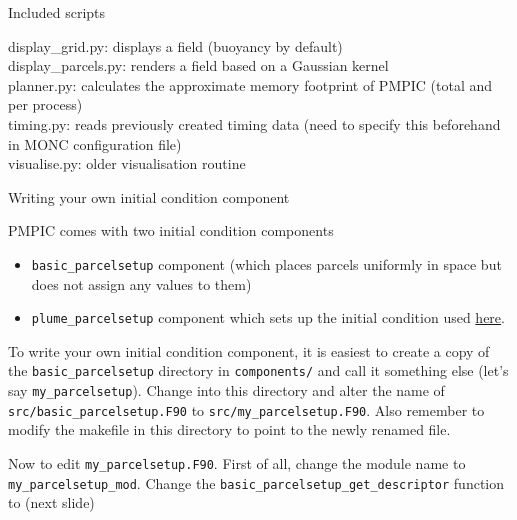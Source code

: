 \documentclass{beamer}
\begin{document}
\begin{frame}{Included scripts}
\protect\hypertarget{included-scripts}{}

display\_grid.py: displays a field (buoyancy by default)\\
display\_parcels.py: renders a field based on a Gaussian kernel\\
planner.py: calculates the approximate memory footprint of PMPIC (total
and per process)\\
timing.py: reads previously created timing data (need to specify this
beforehand in MONC configuration file)\\
visualise.py: older visualisation routine
\end{frame}


\begin{frame}[fragile]{Writing your own initial condition component}
\protect\hypertarget{writing-your-own-initial-condition-component}{}

PMPIC comes with two initial condition components
\begin{itemize}
\item \texttt{basic\_parcelsetup} component (which places parcels uniformly in
space but does not assign any values to them)
\item \texttt{plume\_parcelsetup} component which sets up the initial
condition used
\href{https://rmets.onlinelibrary.wiley.com/doi/10.1002/qj.3319}{here}.
\end{itemize}

To write your own initial condition component, it is easiest to create a
copy of the \texttt{basic\_parcelsetup} directory in
\texttt{components/} and call it something else (let's say
\texttt{my\_parcelsetup}). Change into this directory and alter the name
of \texttt{src/basic\_parcelsetup.F90} to
\texttt{src/my\_parcelsetup.F90}. Also remember to modify the makefile
in this directory to point to the newly renamed file.

Now to edit \texttt{my\_parcelsetup.F90}. First of all, change the
module name to \texttt{my\_parcelsetup\_mod}. Change the
\texttt{basic\_parcelsetup\_get\_descriptor} function to (next slide)
\end{frame}
\end{document}
